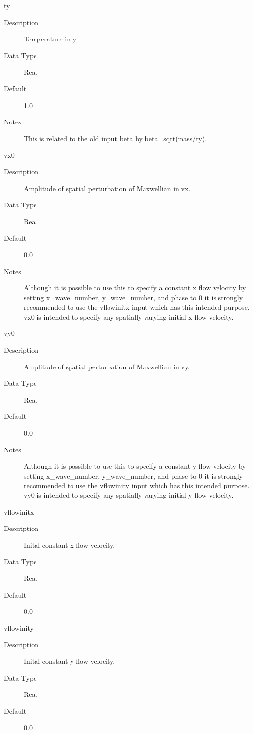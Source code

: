 \documentclass[11pt]{amsart}
\begin{document}
ty
\begin{description}
\item [Description] Temperature in y.
\item [Data Type] Real
\item [Default] 1.0
\item [Notes] This is related to the old input beta by beta=sqrt(mass/ty).
\end{description}

vx0
\begin{description}
\item [Description] Amplitude of spatial perturbation of Maxwellian in vx.
\item [Data Type] Real
\item [Default] 0.0
\item [Notes] Although it is possible to use this to specify a constant x flow
velocity by setting x\_wave\_number, y\_wave\_number, and phase to 0 it is
strongly recommended to use the vflowinitx input which has this intended
purpose.  vx0 is intended to specify any spatially varying initial x flow
velocity.
\end{description}

vy0
\begin{description}
\item [Description] Amplitude of spatial perturbation of Maxwellian in vy.
\item [Data Type] Real
\item [Default] 0.0
\item [Notes] Although it is possible to use this to specify a constant y flow
velocity by setting x\_wave\_number, y\_wave\_number, and phase to 0 it is
strongly recommended to use the vflowinity input which has this intended
purpose.  vy0 is intended to specify any spatially varying initial y flow
velocity.
\end{description}

vflowinitx
\begin{description}
\item [Description] Inital constant x flow velocity.
\item [Data Type] Real
\item [Default] 0.0
\end{description}

vflowinity
\begin{description}
\item [Description] Inital constant y flow velocity.
\item [Data Type] Real
\item [Default] 0.0
\end{description}
\end{document}
